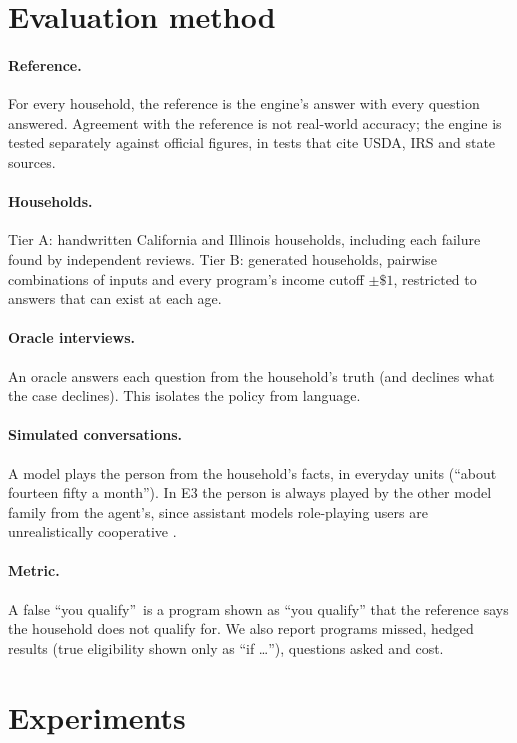 \documentclass[11pt]{article}
\newcommand{\fq}{false ``you qualify''}
\begin{document}
\section{Evaluation method}
\paragraph{Reference.} For every household, the reference is the engine's answer with every question answered. Agreement with the reference is not real-world accuracy; the engine is tested separately against official figures, in tests that cite USDA, IRS and state sources.
\paragraph{Households.} Tier A: handwritten California and Illinois households, including each failure found by independent reviews. Tier B: generated households, pairwise combinations of inputs and every program's income cutoff $\pm\$1$, restricted to answers that can exist at each age.
\paragraph{Oracle interviews.} An oracle answers each question from the household's truth (and declines what the case declines). This isolates the policy from language.
\paragraph{Simulated conversations.} A model plays the person from the household's facts, in everyday units (``about fourteen fifty a month''). In E3 the person is always played by the other model family from the agent's, since assistant models role-playing users are unrealistically cooperative \citep{naous2025userlm}.
\paragraph{Metric.} A \fq\ is a program shown as ``you qualify'' that the reference says the household does not qualify for. We also report programs missed, hedged results (true eligibility shown only as ``if \ldots''), questions asked and cost.

\section{Experiments}
\end{document}
